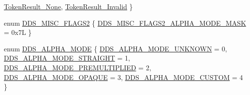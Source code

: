 \begin{DoxyCompactItemize}
\hyperlink{namespacemage_a2178ba2411db5912f41b2e7698c2037da7b27c263e1b0b9cf2795cbc5b34d433e}{Token\+Result\+\_\+\+None}, 
\hyperlink{namespacemage_a2178ba2411db5912f41b2e7698c2037dae7f27c475d583cff0e4521723c9c7e4d}{Token\+Result\+\_\+\+Invalid}
 \}
\item 
enum \hyperlink{namespacemage_a0943eceedce2e66b3b66d0566b15c712}{D\+D\+S\+\_\+\+M\+I\+S\+C\+\_\+\+F\+L\+A\+G\+S2} \{ \hyperlink{namespacemage_a0943eceedce2e66b3b66d0566b15c712af6954b93e1e18fa5366ebb55d65ecbcf}{D\+D\+S\+\_\+\+M\+I\+S\+C\+\_\+\+F\+L\+A\+G\+S2\+\_\+\+A\+L\+P\+H\+A\+\_\+\+M\+O\+D\+E\+\_\+\+M\+A\+SK} = 0x7L
 \}
\item 
enum \hyperlink{namespacemage_a0c586a2bad862f4858900ca121ca80c2}{D\+D\+S\+\_\+\+A\+L\+P\+H\+A\+\_\+\+M\+O\+DE} \{ \newline
\hyperlink{namespacemage_a0c586a2bad862f4858900ca121ca80c2ae15c70e072553fb579ef26eedb737768}{D\+D\+S\+\_\+\+A\+L\+P\+H\+A\+\_\+\+M\+O\+D\+E\+\_\+\+U\+N\+K\+N\+O\+WN} = 0, 
\hyperlink{namespacemage_a0c586a2bad862f4858900ca121ca80c2a2cfa12c9a40e943b5e51043c45db5f95}{D\+D\+S\+\_\+\+A\+L\+P\+H\+A\+\_\+\+M\+O\+D\+E\+\_\+\+S\+T\+R\+A\+I\+G\+HT} = 1, 
\hyperlink{namespacemage_a0c586a2bad862f4858900ca121ca80c2a6dfa3f7a9c0031bc87cc35d8365e3b74}{D\+D\+S\+\_\+\+A\+L\+P\+H\+A\+\_\+\+M\+O\+D\+E\+\_\+\+P\+R\+E\+M\+U\+L\+T\+I\+P\+L\+I\+ED} = 2, 
\hyperlink{namespacemage_a0c586a2bad862f4858900ca121ca80c2a0f5075a259bfecc6fb934b92bcc6dd1d}{D\+D\+S\+\_\+\+A\+L\+P\+H\+A\+\_\+\+M\+O\+D\+E\+\_\+\+O\+P\+A\+Q\+UE} = 3, 
\newline
\hyperlink{namespacemage_a0c586a2bad862f4858900ca121ca80c2a145fc5c46af6e8635680d59f55ce956f}{D\+D\+S\+\_\+\+A\+L\+P\+H\+A\+\_\+\+M\+O\+D\+E\+\_\+\+C\+U\+S\+T\+OM} = 4
 \}
\end{DoxyCompactItemize}
